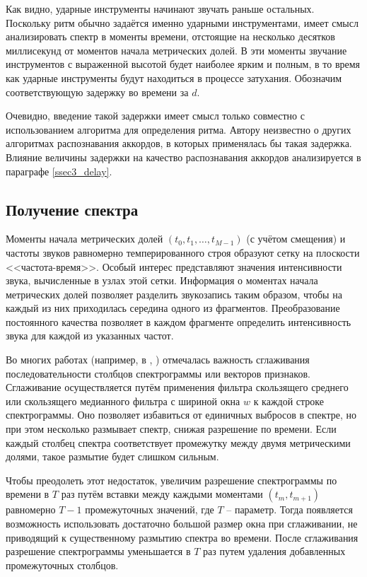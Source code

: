 Как видно, ударные инструменты начинают звучать раньше остальных. Поскольку ритм
обычно задаётся именно ударными инструментами, имеет смысл анализировать спектр
в моменты времени, отстоящие на несколько десятков миллисекунд от моментов
начала метрических долей. В эти моменты звучание инструментов с выраженной
высотой будет наиболее ярким и полным, в то время как ударные инструменты будут
находиться в процессе затухания. Обозначим соответствующую задержку во времени
за $d$.

Очевидно, введение такой задержки имеет смысл только совместно с использованием
алгоритма для определения ритма. Автору неизвестно о других алгоритмах
распознавания аккордов, в которых применялась бы такая задержка. Влияние
величины задержки на качество распознавания аккордов анализируется в параграфе
\ref{ssec3_delay}.

\subsection{Получение спектра} \label{ssect1_spectrum}

Моменты начала метрических долей $(t_0, t_1, \ldots, t_{M-1})$ (с учётом
смещения) и частоты звуков равномерно темперированного строя образуют сетку на
плоскости <<частота-время>>. Особый интерес представляют значения интенсивности
звука, вычисленные в узлах этой сетки. Информация о моментах начала метрических
долей позволяет разделить звукозапись таким образом, чтобы на каждый из них
приходилась середина одного из фрагментов. Преобразование постоянного качества
позволяет в каждом фрагменте определить интенсивность звука для каждой из
указанных частот.

Во многих работах (например, в \cite{Jiang2011}, \cite{Cho2011}) отмечалась
важность сглаживания последовательности столбцов спектрограммы или векторов
признаков. Сглаживание осуществляется путём применения фильтра скользящего
среднего или скользящего медианного фильтра с шириной окна $w$ к каждой строке
спектрограммы. Оно позволяет избавиться от единичных выбросов в спектре, но при
этом несколько размывает спектр, снижая разрешение по времени. Если каждый
столбец спектра соответствует промежутку между двумя метрическими долями, такое
размытие будет слишком сильным.

Чтобы преодолеть этот недостаток, увеличим разрешение спектрограммы по времени в
$T$ раз путём вставки между каждыми моментами $(t_m, t_{m+1})$ равномерно $T-1$
промежуточных значений, где $T$ -- параметр. Тогда появляется возможность
использовать достаточно большой размер окна при сглаживании, не приводящий к
существенному размытию спектра во времени. После сглаживания разрешение
спектрограммы уменьшается в $T$ раз путем удаления добавленных промежуточных
столбцов.

